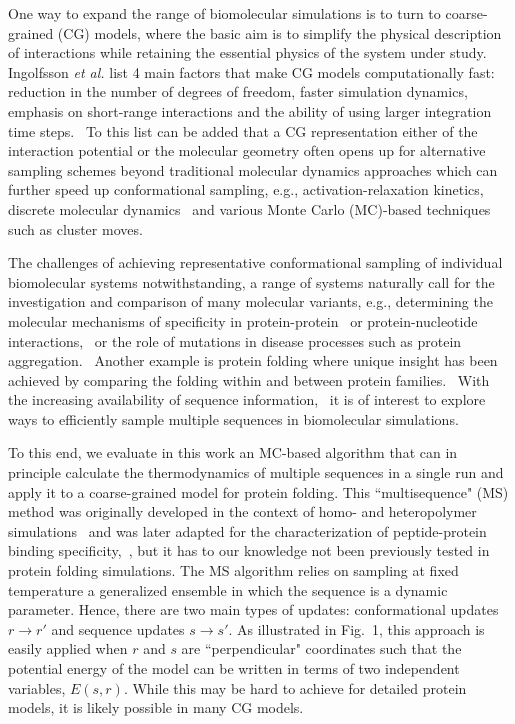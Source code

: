 \documentclass[
aip,
rsi,%
amsmath,amssymb,
reprint,%
]{revtex4-1}
\newcommand	 {\sbar}	{{s}}
\newcommand	 {\rbar}	{{r}}
\begin{document}
One way to expand the range of biomolecular simulations is to turn to coarse-grained (CG) models, where the basic aim is to simplify the physical description of interactions while retaining the essential physics of the system under study.~\cite{Riniker2012} Ingolfsson \textit{et al.} list 4 main factors that make CG models computationally fast: reduction in the number of degrees of freedom, faster simulation dynamics, emphasis on short-range interactions and the ability of using larger integration time steps.~\cite{Ingolfsson2014} To this list can be added that a CG representation either of the interaction potential or the molecular geometry often opens up for alternative sampling schemes beyond traditional molecular dynamics approaches which can further speed up conformational sampling, e.g., activation-relaxation kinetics,~\cite{Beland2011} discrete molecular dynamics~\cite{Proctor2011} and various Monte Carlo (MC)-based techniques such as cluster moves.~\cite{Vitalis2009} 

The challenges of achieving representative conformational sampling of individual biomolecular systems notwithstanding, a range of systems naturally call for the investigation and comparison of many molecular variants, e.g., determining the molecular mechanisms of specificity in protein-protein~\cite{Zarrinpar2003,Hakes2007} or protein-nucleotide interactions,~\cite{Rohs2010} or the role of mutations in disease processes such as protein aggregation.~\cite{Ross2004} Another example is protein folding where unique insight has been achieved by comparing the folding within and between protein families.~\cite{Tzul2017,Wensley2010} With the increasing availability of sequence information,~\cite{Vukmirovic2000} it is of interest to explore ways to efficiently sample multiple sequences in biomolecular simulations. 

To this end, we evaluate in this work an MC-based algorithm that can in principle calculate the thermodynamics of multiple sequences in a single run and apply it to a coarse-grained model for protein folding. This ``multisequence" (MS) method was originally developed in the context of homo- and heteropolymer simulations~\cite{Irback1995} and was later adapted for the characterization of peptide-protein binding specificity,~\cite{Bhattacherjee2013,Wallin2017}, but it has to our knowledge not been previously tested in protein folding simulations. The MS algorithm relies on sampling at fixed temperature a generalized ensemble in which the sequence is a dynamic parameter. Hence, there are two main types of updates: conformational updates $\rbar\rightarrow\rbar'$ and sequence updates $\sbar\rightarrow\sbar'$. As illustrated in Fig.~1, this approach is easily applied when $\rbar$ and $\sbar$ are ``perpendicular" coordinates such that the potential energy of the model can be written in terms of two independent variables, $E(\sbar,\rbar)$. While this may be hard to achieve for detailed protein models, it is likely possible in many CG models.
\end{document}
